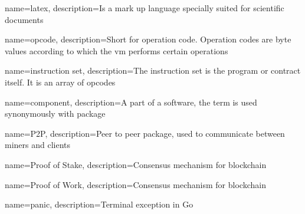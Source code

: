 \makeglossaries

{
        name=latex,
        description={Is a mark up language specially suited for
scientific documents}
}


{
        name=opcode,
        description={Short for operation code. Operation codes are byte values according to which the vm performs certain operations}
}

{
        name=instruction set,
        description={The instruction set is the program or contract itself. It is an array of opcodes}
}

{
        name=component,
        description={A part of a software, the term is used synonymously with package}
}

{
        name=P2P,
        description={Peer to peer package, used to communicate between miners and clients}
}

{
		name=Proof of Stake,
		description={Consensus mechanism for blockchain}
}

{
		name=Proof of Work,
		description={Consensus mechanism for blockchain}
}

{
		name=panic,
		description={Terminal exception in Go}
}